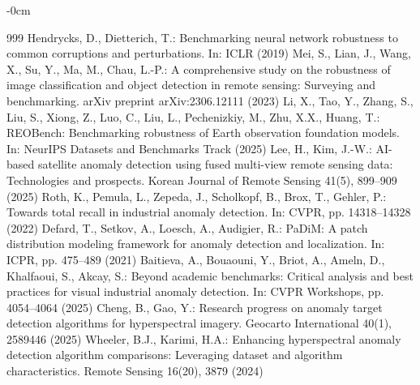 \documentclass[remotesensing,article,submit,pdftex,moreauthors]{Definitions/mdpi}
\begin{document}




\begin{adjustwidth}{-\extralength}{0cm}
\begin{thebibliography}{999}
Hendrycks, D., Dietterich, T.: Benchmarking neural network robustness to common corruptions and perturbations. In: ICLR (2019)
Mei, S., Lian, J., Wang, X., Su, Y., Ma, M., Chau, L.-P.: A comprehensive study on the robustness of image classification and object detection in remote sensing: Surveying and benchmarking. arXiv preprint arXiv:2306.12111 (2023)
Li, X., Tao, Y., Zhang, S., Liu, S., Xiong, Z., Luo, C., Liu, L., Pechenizkiy, M., Zhu, X.X., Huang, T.: REOBench: Benchmarking robustness of Earth observation foundation models. In: NeurIPS Datasets and Benchmarks Track (2025)
Lee, H., Kim, J.-W.: AI-based satellite anomaly detection using fused multi-view remote sensing data: Technologies and prospects. Korean Journal of Remote Sensing 41(5), 899--909 (2025)
Roth, K., Pemula, L., Zepeda, J., Scholkopf, B., Brox, T., Gehler, P.: Towards total recall in industrial anomaly detection. In: CVPR, pp. 14318--14328 (2022)
Defard, T., Setkov, A., Loesch, A., Audigier, R.: PaDiM: A patch distribution modeling framework for anomaly detection and localization. In: ICPR, pp. 475--489 (2021)
Baitieva, A., Bouaouni, Y., Briot, A., Ameln, D., Khalfaoui, S., Akcay, S.: Beyond academic benchmarks: Critical analysis and best practices for visual industrial anomaly detection. In: CVPR Workshops, pp. 4054--4064 (2025)
Cheng, B., Gao, Y.: Research progress on anomaly target detection algorithms for hyperspectral imagery. Geocarto International 40(1), 2589446 (2025)
Wheeler, B.J., Karimi, H.A.: Enhancing hyperspectral anomaly detection algorithm comparisons: Leveraging dataset and algorithm characteristics. Remote Sensing 16(20), 3879 (2024)

\end{thebibliography}
\end{adjustwidth}
\end{document}
